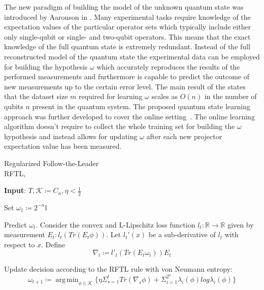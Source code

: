 \documentclass[%
 reprint,
 amsmath,amssymb,
 aps,
]{revtex4-2}
\DeclareMathOperator*{\argmin}{arg\,min}
\begin{document}
The new paradigm of building the model of the unknown quantum state was introduced by Aaronson in \cite{Aaronson_2007}. Many experimental tasks require knowledge of the expectation values of the particular operator sets which typically include either only single-qubit or single- and two-qubit operators. This means that the exact knowledge of the full quantum state is extremely redundant. Instead of the full reconstructed model of the quantum state the experimental data can be employed for building the hypothesis $\omega$ which accurately reproduces the results of the performed measurements and furthermore is capable to predict the outcome of new measurements up to the certain error level. The main result of the \cite{Aaronson_2007} states that the dataset size $m$ required for learning $\omega$ scales as $O(n)$ in the number of qubits $n$ present in the quantum system. The proposed quantum state learning approach was further developed to cover the online setting~\cite{Aaronson_2019, chen2020practical}. The online learning algorithm doesn't require to collect the whole training set for building the $\omega$ hypothesis and instead allows for updating $\omega$ after each new projector expectation value has been measured.

\begin{algorithm}
\caption{Regularized Follow-the-Leader\\ RFTL,~\cite{rftl}}
\hspace*{\algorithmicindent} \textbf{Input}: $T,\mathcal{K}\coloneqq C_n,\eta < \frac{1}{2}$ \\
\begin{algorithmic}[1]
\State Set $\omega_1\coloneqq 2^{-n}\mathbb{I}$

    \State  Predict $\omega_t$. Consider the convex and L-Lipschitz loss function $l_t : \mathbb{R} \rightarrow \mathbb{R}$ given by measurement $E_t : l_t(Tr(E_t\phi))$. Let $l_t'(x)$ be a sub-derivative of $l_t$ with respect to $x$. Define
    $$\nabla_t\coloneqq l'_t(Tr(E_t\omega_t))E_t$$

\State Update decision according to the RFTL rule with von Neumann entropy:
\begin{equation}
\label{eq:rftl}
  \omega_{t+1}\coloneqq\argmin_{\phi\in\mathcal{K}}{\big\{ \eta\Sigma_{s=1}^tTr(\nabla_s\phi)+\Sigma_{i=1}^{2^n}\lambda_i(\phi)log\lambda_i(\phi) \big\}}  
\end{equation}

\EndFor

\end{algorithmic}
\label{algo:rftl}
\end{algorithm}
\end{document}
